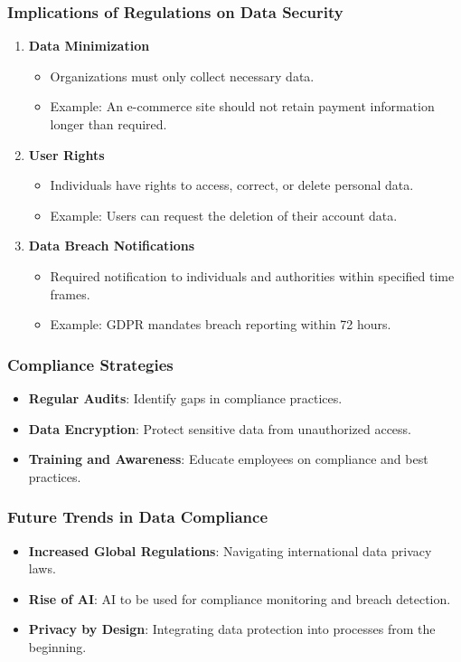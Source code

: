 \documentclass{beamer}
\begin{document}
\begin{frame}[fragile]
    \frametitle{Implications of Regulations on Data Security}
    \begin{enumerate}
        \item \textbf{Data Minimization}
            \begin{itemize}
                \item Organizations must only collect necessary data.
                \item Example: An e-commerce site should not retain payment information longer than required.
            \end{itemize}
        \item \textbf{User Rights}
            \begin{itemize}
                \item Individuals have rights to access, correct, or delete personal data.
                \item Example: Users can request the deletion of their account data.
            \end{itemize}
        \item \textbf{Data Breach Notifications}
            \begin{itemize}
                \item Required notification to individuals and authorities within specified time frames.
                \item Example: GDPR mandates breach reporting within 72 hours.
            \end{itemize}
    \end{enumerate}
\end{frame}

\begin{frame}[fragile]
    \frametitle{Compliance Strategies}
    \begin{itemize}
        \item \textbf{Regular Audits}: Identify gaps in compliance practices.
        \item \textbf{Data Encryption}: Protect sensitive data from unauthorized access.
        \item \textbf{Training and Awareness}: Educate employees on compliance and best practices.
    \end{itemize}
\end{frame}

\begin{frame}[fragile]
    \frametitle{Future Trends in Data Compliance}
    \begin{itemize}
        \item \textbf{Increased Global Regulations}: Navigating international data privacy laws.
        \item \textbf{Rise of AI}: AI to be used for compliance monitoring and breach detection.
        \item \textbf{Privacy by Design}: Integrating data protection into processes from the beginning.
    \end{itemize}
\end{frame}
\end{document}
